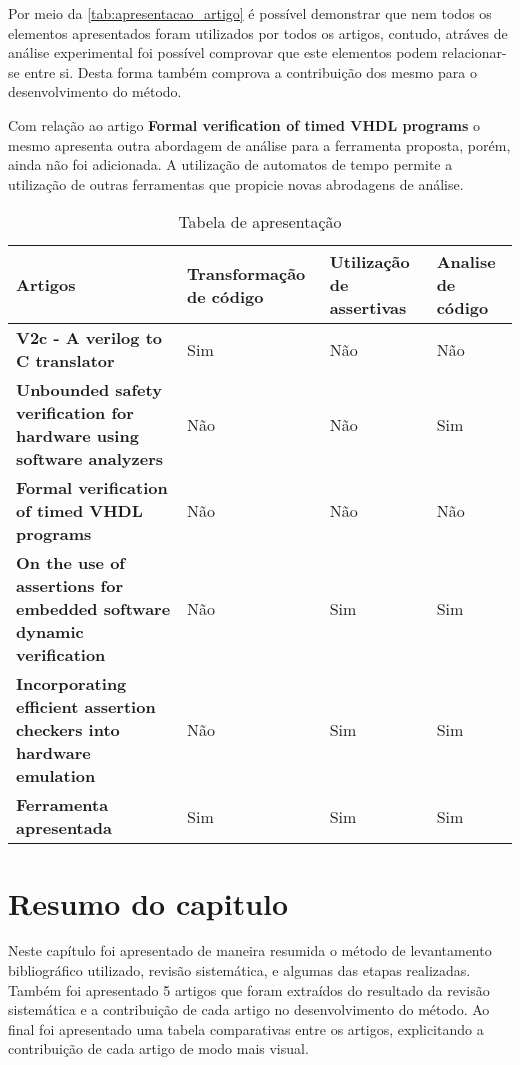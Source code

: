\par
Por meio da \autoref{tab:apresentacao_artigo} é possível demonstrar que nem todos os elementos apresentados foram utilizados por todos os artigos, contudo, atráves de análise experimental foi possível comprovar que este elementos podem relacionar-se entre si. Desta forma também comprova a contribuição dos mesmo para o desenvolvimento do método.

\par
Com relação ao artigo \textbf{Formal verification of timed VHDL programs} o mesmo apresenta outra abordagem de análise para a ferramenta proposta, porém, ainda não foi adicionada. A utilização de automatos de tempo permite a utilização de outras ferramentas que propicie novas abrodagens de análise. 

\begin{table}[H]
\centering
  \caption{Tabela de apresentação}
  \label{tab:apresentacao_artigo}
\begin{tabular}{|p{}|p{3cm}|p{}|p{2cm}|}
\hline
\textbf{Artigos} & \textbf{Transformação de código} & \textbf{Utilização de assertivas} & \textbf{Analise de código} \\ \hline
\textbf{V2c - A verilog to C translator} & Sim & Não & Não \\ \hline
\textbf{Unbounded safety verification for hardware using software analyzers} & Não & Não & Sim \\ \hline
\textbf{Formal verification of timed VHDL programs} & Não & Não & Não \\ \hline
\textbf{On the use of assertions for embedded software dynamic verification} & Não & Sim & Sim \\ \hline
\textbf{Incorporating efficient assertion checkers into hardware emulation} & Não & Sim & Sim \\ \hline
\textbf{Ferramenta apresentada} & Sim & Sim & Sim \\ \hline
\end{tabular}
\end{table}

\section{Resumo do capitulo}
\par
Neste capítulo foi apresentado de maneira resumida o método de levantamento bibliográfico utilizado, revisão sistemática, e algumas das etapas realizadas. Também foi apresentado 5 artigos que foram extraídos do resultado da revisão sistemática e a contribuição de cada artigo no desenvolvimento do método. Ao final foi apresentado uma tabela comparativas entre os artigos, explicitando a contribuição de cada artigo de modo mais visual.